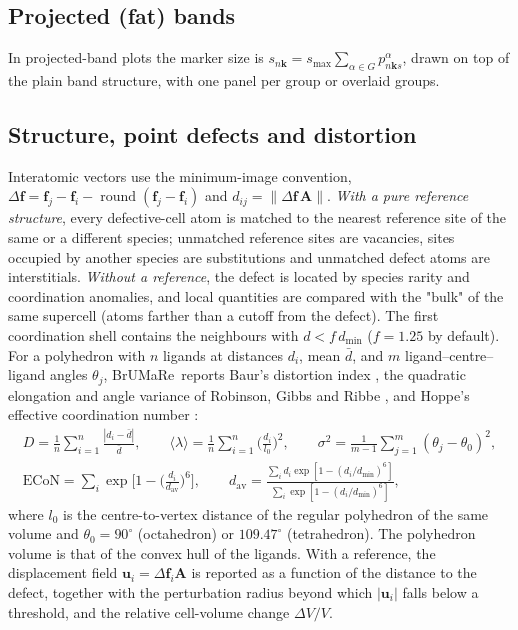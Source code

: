 \documentclass[11pt,a4paper]{article}
\newcommand{\BMR}{\textsf{BrUMa\textcolor[HTML]{B26B00}{Re}}}
\begin{document}
\subsection{Projected (fat) bands}
In projected-band plots the marker size is $s_{n\bm{k}}=s_\mathrm{max}\sum_{\alpha\in G}p^{\alpha}_{n\bm{k} s}$, drawn on top of the plain band structure, with one panel per group or overlaid groups.

\subsection{Structure, point defects and distortion}
Interatomic vectors use the minimum-image convention, $\Delta\mathbf f=\mathbf f_j-\mathbf f_i-\operatorname{round}(\mathbf f_j-\mathbf f_i)$ and $d_{ij}=\lVert\Delta\mathbf f\,\mathbf A\rVert$. \emph{With a pure reference structure}, every defective-cell atom is matched to the nearest reference site of the same or a different species; unmatched reference sites are vacancies, sites occupied by another species are substitutions and unmatched defect atoms are interstitials. \emph{Without a reference}, the defect is located by species rarity and coordination anomalies, and local quantities are compared with the "bulk" of the same supercell (atoms farther than a cutoff from the defect). The first coordination shell contains the neighbours with $d<f\,d_\mathrm{min}$ ($f=1.25$ by default). For a polyhedron with $n$ ligands at distances $d_i$, mean $\bar d$, and $m$ ligand–centre–ligand angles $\theta_j$, \BMR\ reports Baur's distortion index \cite{baur1974}, the quadratic elongation and angle variance of Robinson, Gibbs and Ribbe \cite{robinson1971}, and Hoppe's effective coordination number \cite{hoppe1979}:
\begin{gather}
D=\frac1n\sum_{i=1}^{n}\frac{|d_i-\bar d|}{\bar d},\qquad
\langle\lambda\rangle=\frac1n\sum_{i=1}^{n}\Big(\frac{d_i}{l_0}\Big)^2,\qquad
\sigma^2=\frac{1}{m-1}\sum_{j=1}^{m}(\theta_j-\theta_0)^2,\\
\mathrm{ECoN}=\sum_{i}\exp\!\Big[1-\Big(\frac{d_i}{d_\mathrm{av}}\Big)^6\Big],\qquad
d_\mathrm{av}=\frac{\sum_i d_i\exp[1-(d_i/d_\mathrm{min})^6]}{\sum_i\exp[1-(d_i/d_\mathrm{min})^6]},
\end{gather}
where $l_0$ is the centre-to-vertex distance of the regular polyhedron of the same volume and $\theta_0=90^\circ$ (octahedron) or $109.47^\circ$ (tetrahedron). The polyhedron volume is that of the convex hull of the ligands. With a reference, the displacement field $\mathbf u_i=\Delta\mathbf f_i\mathbf A$ is reported as a function of the distance to the defect, together with the perturbation radius beyond which $|\mathbf u_i|$ falls below a threshold, and the relative cell-volume change $\Delta V/V$.
\end{document}
